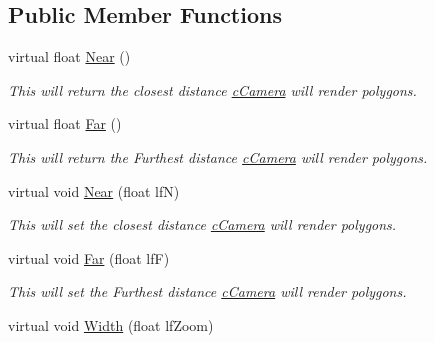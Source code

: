 \subsection*{Public Member Functions}
\begin{DoxyCompactItemize}
\item 
\hypertarget{classc_perspective_control_af4c9bf530c680788925079d1ed64f7db}{
virtual float \hyperlink{classc_perspective_control_af4c9bf530c680788925079d1ed64f7db}{Near} ()}
\label{classc_perspective_control_af4c9bf530c680788925079d1ed64f7db}

\begin{DoxyCompactList}\small\item\em This will return the closest distance \hyperlink{classc_camera}{cCamera} will render polygons. \end{DoxyCompactList}\item 
\hypertarget{classc_perspective_control_aa2a129ba8718923f805335bdb7661f40}{
virtual float \hyperlink{classc_perspective_control_aa2a129ba8718923f805335bdb7661f40}{Far} ()}
\label{classc_perspective_control_aa2a129ba8718923f805335bdb7661f40}

\begin{DoxyCompactList}\small\item\em This will return the Furthest distance \hyperlink{classc_camera}{cCamera} will render polygons. \end{DoxyCompactList}\item 
\hypertarget{classc_perspective_control_ae40f04af303e00f9abdb21ca9a25581d}{
virtual void \hyperlink{classc_perspective_control_ae40f04af303e00f9abdb21ca9a25581d}{Near} (float lfN)}
\label{classc_perspective_control_ae40f04af303e00f9abdb21ca9a25581d}

\begin{DoxyCompactList}\small\item\em This will set the closest distance \hyperlink{classc_camera}{cCamera} will render polygons. \end{DoxyCompactList}\item 
\hypertarget{classc_perspective_control_a5aa44c5690ac0db66157d8c08ecf0a9b}{
virtual void \hyperlink{classc_perspective_control_a5aa44c5690ac0db66157d8c08ecf0a9b}{Far} (float lfF)}
\label{classc_perspective_control_a5aa44c5690ac0db66157d8c08ecf0a9b}

\begin{DoxyCompactList}\small\item\em This will set the Furthest distance \hyperlink{classc_camera}{cCamera} will render polygons. \end{DoxyCompactList}\item 
\hypertarget{classc_perspective_control_add5f74b61fe689841d0de7cfcaad56f9}{
virtual void \hyperlink{classc_perspective_control_add5f74b61fe689841d0de7cfcaad56f9}{Width} (float lfZoom)}
\label{classc_perspective_control_add5f74b61fe689841d0de7cfcaad56f9}


\end{DoxyCompactItemize}

